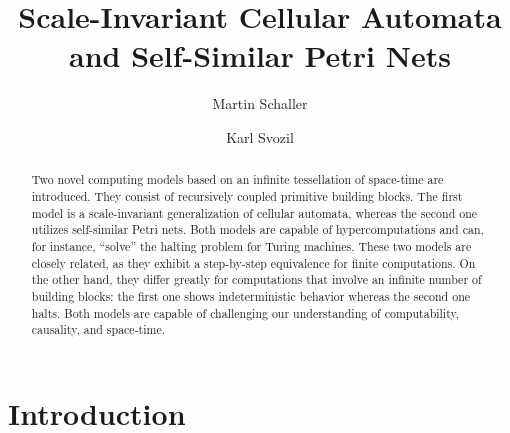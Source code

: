 \documentclass[pre,showpacs,showkeys,preprint]{revtex4}
\theoremstyle{definition}
\begin{document}


\title{Scale-Invariant Cellular Automata and Self-Similar Petri Nets}

\author{Martin Schaller}

\author{Karl Svozil}




\begin{abstract}
Two novel computing models based on an infinite tessellation of space-time are introduced. They consist of recursively coupled primitive building blocks. The first model is a scale-invariant generalization of cellular automata, whereas the second one utilizes self-similar Petri nets. Both models are capable of hypercomputations and can, for instance, ``solve'' the halting problem for Turing machines. These two models are closely related, as they exhibit a step-by-step equivalence for finite computations. On the other hand, they differ greatly for computations that involve an infinite number of building blocks: the first one shows indeterministic behavior whereas the second one halts. Both models are capable of challenging our understanding of computability, causality, and space-time.
\end{abstract}




\maketitle

\section{Introduction}

\end{document}
